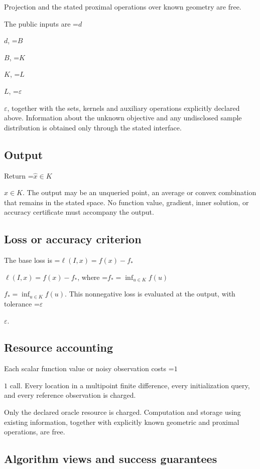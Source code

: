 \documentclass[10pt,a4paper]{article}
\newcommand{\AtlasMath}[1]{\par\begingroup\centering\setbox0=\hbox{$\displaystyle #1$}\ifdim\wd0>1.4\linewidth\typeout{ATLAS WIDE FORMULA: \the\wd0}\fi\ifdim\wd0>\linewidth\resizebox{\linewidth}{!}{\box0}\else\box0\fi\par\endgroup}
\newcommand{\AtlasInlineMath}[1]{\begingroup\setbox0=\hbox{$#1$}\ifdim\wd0>.4\linewidth\endgroup\AtlasMath{#1}\else\endgroup$#1$\fi}
\begin{document}
Projection and the stated proximal operations over known geometry are free.



The public inputs are \AtlasInlineMath{d}, \AtlasInlineMath{B}, \AtlasInlineMath{K}, \AtlasInlineMath{L}, \AtlasInlineMath{\varepsilon}, together with the sets, kernels and auxiliary operations explicitly declared above. Information about the unknown objective and any undisclosed sample distribution is obtained only through the stated interface.



\subsection{Output}


Return \AtlasInlineMath{\widehat{x}\in K}. The output may be an unqueried point, an average or convex combination that remains in the stated space. No function value, gradient, inner solution, or accuracy certificate must accompany the output.



\subsection{Loss or accuracy criterion}


The base loss is \AtlasInlineMath{\ell(I,x)=f(x)-f_*}, where \AtlasInlineMath{f_*=\inf_{u\in K}f(u)}. This nonnegative loss is evaluated at the output, with tolerance \AtlasInlineMath{\varepsilon}.



\subsection{Resource accounting}


Each scalar function value or noisy observation costs \AtlasInlineMath{1} call. Every location in a multipoint finite difference, every initialization query, and every reference observation is charged.



Only the declared oracle resource is charged. Computation and storage using existing information, together with explicitly known geometric and proximal operations, are free.



\subsection{Algorithm views and success guarantees}
\end{document}
